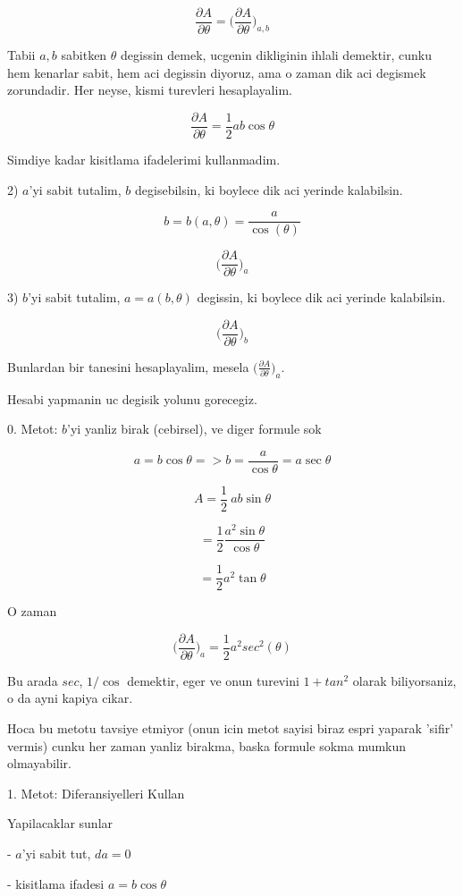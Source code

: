 \documentclass[12pt,fleqn]{article}\usepackage{../common}
\begin{document}
\[ \frac{\partial A}{\partial \theta} = 
\bigg( \frac{\partial A}{\partial \theta} \bigg)_{a,b}  \]

Tabii $a,b$ sabitken $\theta$ degissin demek, ucgenin dikliginin ihlali
demektir, cunku hem kenarlar sabit, hem aci degissin diyoruz, ama o zaman
dik aci degismek zorundadir. Her neyse, kismi turevleri hesaplayalim. 

\[ \frac{\partial A}{\partial \theta} = \frac{1}{2}ab \cos\theta \]

Simdiye kadar kisitlama ifadelerimi kullanmadim. 

2) $a$'yi sabit tutalim, $b$ degisebilsin, ki boylece dik aci yerinde
kalabilsin. 

\[ b = b(a,\theta) = \frac{a}{\cos(\theta)} \]

\[ \bigg( \frac{\partial A}{\partial \theta} \bigg)_{a}  \]

3) $b$'yi sabit tutalim, $a = a(b,\theta)$ degissin, ki boylece dik aci yerinde
kalabilsin. 

\[ \bigg( \frac{\partial A}{\partial \theta} \bigg)_{b}  \]

Bunlardan bir tanesini hesaplayalim, mesela $\bigg( \frac{\partial A}{\partial \theta} \bigg)_{a} $.

Hesabi yapmanin uc degisik yolunu gorecegiz. 

0. Metot: $b$'yi yanliz birak (cebirsel), ve diger formule sok

\[ a = b \cos \theta => b = \frac{a}{\cos\theta} = a \sec\theta\]

\[ A = \frac{1}{2} \ ab \sin\theta \]

\[ = \frac{1}{2} \frac{a^2 \sin \theta}{\cos \theta} \]

\[ = \frac{1}{2} a^2 \tan \theta \]

O zaman 

\[ \bigg( \frac{\partial A}{\partial \theta} \bigg)_{a} = 
\frac{1}{2}a^2sec^2(\theta)
 \]

Bu arada $sec$, $1/\cos$ demektir, eger ve onun turevini $1+tan^2$ olarak
biliyorsaniz, o da ayni kapiya cikar. 

Hoca bu metotu tavsiye etmiyor (onun icin metot sayisi biraz espri yaparak
'sifir' vermis) cunku her zaman yanliz birakma, baska formule sokma mumkun
olmayabilir.

1. Metot: Diferansiyelleri Kullan

Yapilacaklar sunlar

- $a$'yi sabit tut, $da = 0$

- kisitlama ifadesi $a = b \cos\theta$
\end{document}
